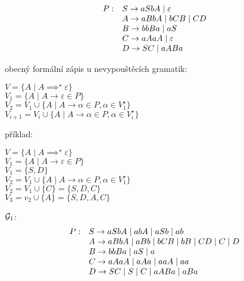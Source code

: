 \[
    \begin{array}{l l}
        P: & S \rightarrow aSbA \mid \varepsilon \\
           & A \rightarrow aBbA \mid bCB \mid CD \\
           & B \rightarrow bbBa \mid aS \\
           & C \rightarrow aAaA \mid \varepsilon \\
           & D \rightarrow SC \mid aABa \\
    \end{array}
\]


obecný formální zápis u nevypouštěcích gramatik:

$V = \{A \mid A \implies^{\star} \varepsilon \}$\\
$V_1 = \{A \mid A \rightarrow \varepsilon \in P\}$\\
$V_2 = V_1 \cup \{A \mid A \rightarrow \alpha \in P, \alpha \in V_1^{\star}\}$\\
$V_{i+1} = V_i \cup \{A \mid A \rightarrow \alpha \in P, \alpha \in V_i^{\star}\}$\\

\begin{multicols}{2}
příklad: 

$V = \{A \mid A \implies^{\star} \varepsilon \}$\\
$V_1 = \{A \mid A \rightarrow \varepsilon \in P\}$\\
$V_1 = \{S, D\}$\\
$V_2 = V_1 \cup \{A \mid A \rightarrow \alpha \in P, \alpha \in V_1^{\star}\}$\\
$V_2 = V_1 \cup \{C\} = \{S, D, C\}$\\
$V_3 = v_2 \cup \{A\} = \{S, D, A, C\}$        


\columnbreak

$\mathcal{G}_1$:
    \[
    \begin{array}{l l}
        P: & S \rightarrow aSbA \mid abA \mid aSb \mid ab  \\
           & A \rightarrow aBbA \mid aBb \mid bCB \mid bB \mid CD \mid C \mid D \\
           & B \rightarrow bbBa \mid aS \mid a\\
           & C \rightarrow aAaA \mid aAa \mid aaA \mid aa \\
           & D \rightarrow SC \mid S \mid C \mid aABa \mid aBa \\
    \end{array}
\]

\end{multicols}


